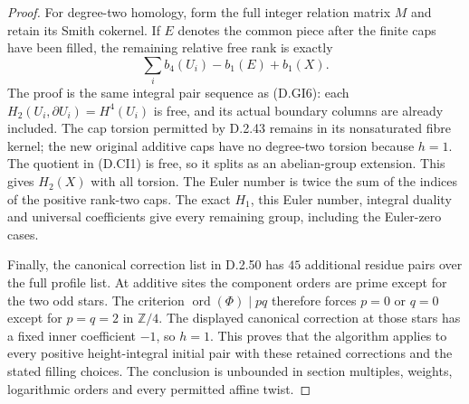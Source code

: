 \begin{proof}
For degree-two homology, form the full integer
relation matrix $M$ and retain its Smith cokernel.
If $E$ denotes the common piece after the finite
caps have been filled, the remaining relative
free rank is exactly
\[
           \sum_i b_4(U_i)-b_1(E)+b_1(X).
                                                        \tag{D.CI1}
\]
The proof is the same integral pair sequence as
(D.GI6): each $H_2(U_i,\partial U_i)=H^4(U_i)$
is free, and its actual boundary columns are
already included. The cap torsion permitted by
D.2.43 remains in its nonsaturated fibre kernel;
the new original additive caps have no degree-two
torsion because $h=1$. The quotient in (D.CI1)
is free, so it splits as an abelian-group extension.
This gives $H_2(X)$ with all torsion.
The Euler number is twice the sum of the indices
of the positive rank-two caps. The exact $H_1$,
this Euler number, integral duality and universal
coefficients give every remaining group, including
the Euler-zero cases.

Finally, the canonical correction list in D.2.50
has $45$ additional residue pairs over the full
profile list. At additive sites the component
orders are prime except for the two odd stars.
The criterion $\operatorname{ord}(\Phi)\mid pq$
therefore forces $p=0$ or $q=0$ except for
$p=q=2$ in $\mathbb Z/4$.
The displayed canonical correction at those
stars has a fixed inner coefficient $-1$,
so $h=1$. This proves that the algorithm applies
to every positive height-integral initial pair
with these retained corrections and the stated
filling choices. The conclusion is unbounded in
section multiples, weights, logarithmic orders
and every permitted affine twist.
\end{proof}
